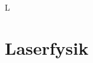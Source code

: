 L\documentclass[crop=false, class=memoir]{standalone}
\begin{document}
\chapter{Laserfysik} \label{chap:laser_facit}
\end{document}
